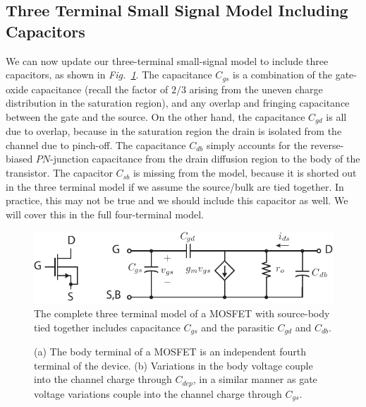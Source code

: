 \subsection{Three Terminal Small Signal Model Including Capacitors}
We can now update our three-terminal small-signal model to include three capacitors, as shown in \emph{Fig.~\ref{fig:mos3term_ac}}.  The capacitance $C_{gs}$ is a combination of the gate-oxide capacitance (recall the factor of $2/3$ arising from the uneven charge distribution in the saturation region), and any overlap and fringing capacitance between the gate and the source.  On the other hand, the capacitance $C_{gd}$ is all due to overlap, because in the saturation region the drain is isolated from the channel due to pinch-off.  The capacitance $C_{db}$ simply accounts for the reverse-biased $PN$-junction capacitance from the drain diffusion region to the body of the transistor.  The capacitor $C_{sb}$ is missing from the model, because it is shorted out in the three terminal model if we assume the source/bulk are tied together.  In practice, this may not be true and we should include this capacitor as well.  We will cover this in the full four-terminal model.
\begin{figure}[H]
\centering
\includegraphics[scale=1.35]{mos3term_ac}
\caption{The complete three terminal model of a MOSFET with source-body tied together includes  capacitance $C_{gs}$ and the parasitic $C_{gd}$ and $C_{db}$.}
\label{fig:mos3term_ac}
\end{figure}
\newpage
\begin{figure}[t]
\centering
{}
\caption{(a) The body terminal of a MOSFET is an independent fourth terminal of the device.  (b) Variations in the body voltage couple into the channel charge through $C_{dep}$, in a similar manner as gate voltage variations couple into the channel charge through $C_{gs}$.} 
\end{figure}
